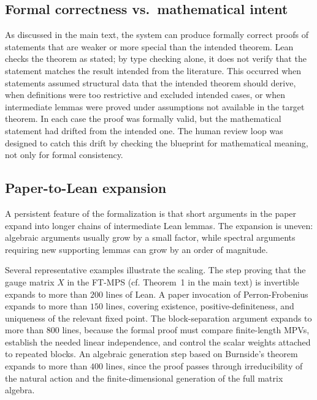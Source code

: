 \subsection{Formal correctness vs.\ mathematical intent}

As discussed in the main text, the system can produce formally correct proofs of statements that are weaker or more special than the intended theorem. Lean checks the theorem as stated; by type checking alone, it does not verify that the statement matches the result intended from the literature. This occurred when statements assumed structural data that the intended theorem should derive, when definitions were too restrictive and excluded intended cases, or when intermediate lemmas were proved under assumptions not available in the target theorem. In each case the proof was formally valid, but the mathematical statement had drifted from the intended one. The human review loop was designed to catch this drift by checking the blueprint for mathematical meaning, not only for formal consistency.


\subsection{Paper-to-Lean expansion}\label{sec:expansion}

A persistent feature of the formalization is that short arguments in the paper expand into longer chains of intermediate Lean lemmas. The expansion is uneven: algebraic arguments usually grow by a small factor, while spectral arguments requiring new supporting lemmas can grow by an order of magnitude.


Several representative examples illustrate the scaling. The step proving that the gauge matrix $X$ in the FT-MPS (cf. Theorem~1 in the main text) is invertible expands to more than $200$ lines of Lean. A paper invocation of Perron-Frobenius expands to more than $150$ lines, covering existence, positive-definiteness, and uniqueness of the relevant fixed point. The block-separation argument expands to more than $800$ lines, because the formal proof must compare finite-length MPVs, establish the needed linear independence, and control the scalar weights attached to repeated blocks. An algebraic generation step based on Burnside's theorem expands to more than $400$ lines, since the proof passes through irreducibility of the natural action and the finite-dimensional generation of the full matrix algebra.





